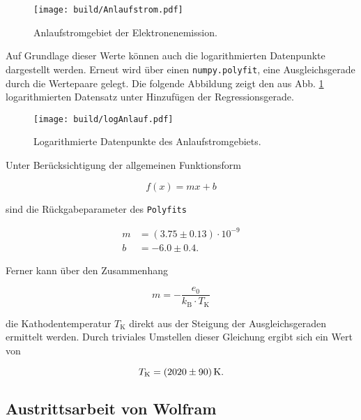 \begin{figure}[H]
    \centering 
    \texttt{[image: build/Anlaufstrom.pdf]}
    \caption{Anlaufstromgebiet der Elektronenemission.}
    \label{fig:Kennlinien2}
\end{figure}

\noindent Auf Grundlage dieser Werte können auch die logarithmierten Datenpunkte dargestellt werden. Erneut wird über einen \texttt{numpy.polyfit},
eine Ausgleichsgerade durch die Wertepaare gelegt. Die folgende Abbildung zeigt den aus Abb. \ref{fig:Kennlinien2} logarithmierten Datensatz unter 
Hinzufügen der Regressionsgerade.

\begin{figure}[H]
    \centering 
    \texttt{[image: build/logAnlauf.pdf]}
    \caption{Logarithmierte Datenpunkte des Anlaufstromgebiets.}
    \label{fig:Anlaufstromgebiet}
\end{figure}

\noindent Unter Berücksichtigung der allgemeinen Funktionsform 

\begin{equation*}
    f(x) = mx + b 
\end{equation*}

\noindent sind die Rückgabeparameter des \texttt{Polyfits}

\begin{align*}
    m &= \left(3.75\pm{}0.13\right)\cdot{}10^{-9}\\
    b &= -6.0\pm{}0.4.
\end{align*}

\noindent Ferner kann über den Zusammenhang 

\begin{equation*}
    m = -\frac{e_0}{k_\text{B}\cdot{}T_\text{K}}
\end{equation*}

\noindent die Kathodentemperatur $T_\text{K}$ direkt aus der Steigung der Ausgleichsgeraden ermittelt werden. Durch triviales Umstellen 
dieser Gleichung ergibt sich ein Wert von 

\begin{equation*}
    T_\text{K} = \qty{2020\pm90}{\kelvin}.
\end{equation*}

\subsection{Austrittsarbeit von Wolfram}
\label{sec:Austrittsarbeit}

